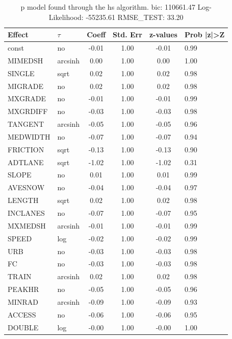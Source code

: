 \begin{table}
	\caption{p model found through the hs algorithm. bic: 110661.47 Log-Likelihood: -55235.61 RMSE_TEST: 33.20}
	\begin{center}
		\begin{tabular}{|l|l|c|c|c|l|}
			\hline
			Effect & $\tau$ & Coeff & Std. Err & z-values & Prob |z|>Z \\
			\hline
			const & no & -0.01 & 1.00 & -0.01 & 0.99 \\
			\hline
			MIMEDSH & arcsinh & 0.00 & 1.00 & 0.00 & 1.00 \\
			\hline
			SINGLE & sqrt & 0.02 & 1.00 & 0.02 & 0.98 \\
			\hline
			MIGRADE & no & 0.02 & 1.00 & 0.02 & 0.98 \\
			\hline
			MXGRADE & no & -0.01 & 1.00 & -0.01 & 0.99 \\
			\hline
			MXGRDIFF & no & -0.03 & 1.00 & -0.03 & 0.98 \\
			\hline
			TANGENT & arcsinh & -0.05 & 1.00 & -0.05 & 0.96 \\
			\hline
			MEDWIDTH & no & -0.07 & 1.00 & -0.07 & 0.94 \\
			\hline
			FRICTION & sqrt & -0.13 & 1.00 & -0.13 & 0.90 \\
			\hline
			ADTLANE & sqrt & -1.02 & 1.00 & -1.02 & 0.31 \\
			\hline
			SLOPE & no & 0.01 & 1.00 & 0.01 & 0.99 \\
			\hline
			AVESNOW & no & -0.04 & 1.00 & -0.04 & 0.97 \\
			\hline
			LENGTH & sqrt & 0.02 & 1.00 & 0.02 & 0.98 \\
			\hline
			INCLANES & no & -0.07 & 1.00 & -0.07 & 0.95 \\
			\hline
			MXMEDSH & arcsinh & -0.01 & 1.00 & -0.01 & 0.99 \\
			\hline
			SPEED & log & -0.02 & 1.00 & -0.02 & 0.99 \\
			\hline
			URB & no & -0.03 & 1.00 & -0.03 & 0.98 \\
			\hline
			FC & no & -0.03 & 1.00 & -0.03 & 0.98 \\
			\hline
			TRAIN & arcsinh & 0.02 & 1.00 & 0.02 & 0.98 \\
			\hline
			PEAKHR & no & -0.05 & 1.00 & -0.05 & 0.96 \\
			\hline
			MINRAD & arcsinh & -0.09 & 1.00 & -0.09 & 0.93 \\
			\hline
			ACCESS & no & -0.06 & 1.00 & -0.06 & 0.95 \\
			\hline
			DOUBLE & log & -0.00 & 1.00 & -0.00 & 1.00 \\

\end{tabular}
\end{center}
\end{table}
